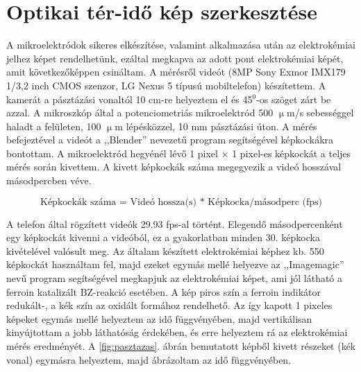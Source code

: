 \section{Optikai tér-idő kép szerkesztése}

A mikroelektródok sikeres elkészítése, valamint alkalmazása után az elektrokémiai jelhez képet rendelhetünk, ezáltal megkapva az adott pont elektrokémiai képét, amit következőképpen csináltam. A mérésről videót (8MP Sony Exmor IMX179 1/3,2 inch CMOS szenzor, LG Nexus 5 típusú mobiltelefon) készítettem. A kamerát a pásztázási vonaltól 10 cm-re helyeztem el és 45$^0$-os szöget zárt be azzal. A mikroszkóp által a potenciometriás mikroelektród 500 $\upmu$m/s sebességgel haladt a felületen, 100 $\upmu$m lépésközzel, 10 mm pásztázási úton. A mérés befejeztével a videót a ,,Blender'' \cite{blender1} nevezetű program segítségével képkockákra bontottam. A mikroelektród hegyénél lévő 1 pixel $\times$ 1 pixel-es képkockát a teljes mérés során kivettem. A kivett képkockák száma megegyezik a videó hosszával másodpercben véve.

\begin{equation} 
\textrm{Képkockák száma = Videó hossza(s) * Képkocka/másodperc (fps)}
\end{equation}

A telefon által rögzített videók 29.93 fps-al történt. Elegendő másodpercenként egy képkockát kivenni a videóból, ez a gyakorlatban minden 30. képkocka kivételével valósult meg. Az általam készített elektrokémiai képhez kb. 550 képkockát használtam fel, majd ezeket egymás mellé helyezve az ,,Imagemagic'' \cite{imagemagick-web-2013} nevű program segítségével megkapjuk az elektrokémiai képet, ami jól látható a ferroin katalizált BZ-reakció esetében. A kép piros szín a ferroin indikátor redukált-, a kék szín az oxidált formához rendelhető. Az így kapott 1 pixeles képeket egymás mellé helyeztem az idő függvényében, majd vertikálisan kinyújtottam a jobb láthatóság érdekében, és erre helyeztem rá az elektrokémiai mérés eredményét.
A \ref{fig:pasztazas}. ábrán bemutatott képből kivett részeket (kék vonal) egymásra helyeztem, majd ábrázoltam az idő függvényében.

